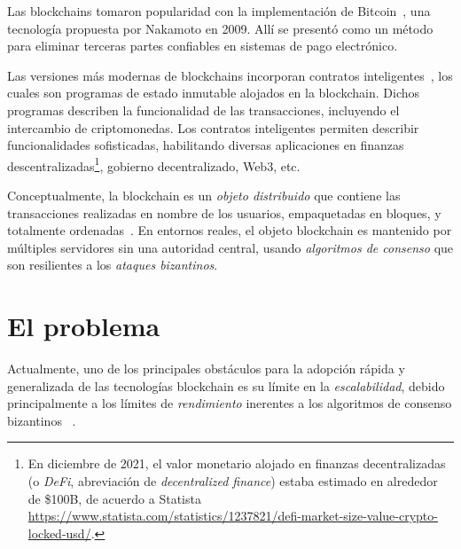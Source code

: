 Las blockchains tomaron
popularidad con la implementación de Bitcoin~\cite{nakamoto06bitcoin},
una tecnología propuesta por Nakamoto en 2009.
Allí se presentó como un método para eliminar terceras partes confiables en sistemas
de pago electrónico.
%

Las versiones más modernas de blockchains incorporan contratos inteligentes~\cite{szabo96smart,ethereum},
los cuales son programas de estado inmutable alojados en la blockchain. Dichos
programas describen la funcionalidad de las transacciones, incluyendo el intercambio
de criptomonedas.
%
Los contratos inteligentes permiten describir funcionalidades sofisticadas, habilitando
diversas aplicaciones en finanzas descentralizadas\footnote{En diciembre de 2021,
el valor monetario alojado en finanzas decentralizadas (o \emph{DeFi}, abreviación de \emph{decentralized finance})
estaba estimado en alrededor de \$100B, de acuerdo a Statista
\url{https://www.statista.com/statistics/1237821/defi-market-size-value-crypto-locked-usd/}.},
gobierno decentralizado, Web3, etc.
%

Conceptualmente, la blockchain es un \textit{objeto distribuido}
que contiene las transacciones realizadas
en nombre de los usuarios, empaquetadas en bloques, y totalmente
ordenadas~\cite{anta2018formalizing,anta2021principles}.
%
En entornos reales, el objeto blockchain es mantenido por múltiples servidores
sin una autoridad central, usando \emph{algoritmos de consenso} que son resilientes a los
\emph{ataques bizantinos}.
%



\section{El problema}

Actualmente, uno de los principales obstáculos para la adopción rápida y generalizada
de las tecnologías blockchain es su límite en la \emph{escalabilidad}, debido principalmente a los límites
de \emph{rendimiento} inerentes a los algoritmos de consenso bizantinos
~\cite{Tyagi@BlockchainScalabilitySol,Croman2016ScalingDecentralizedBlockchain}.

